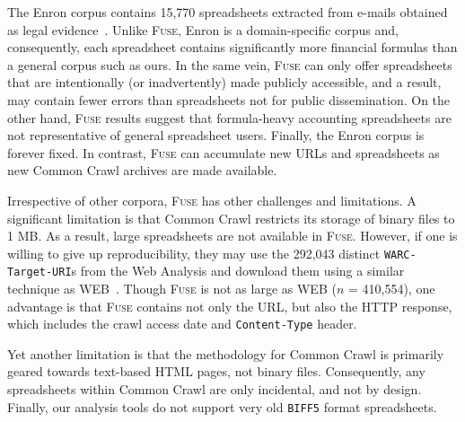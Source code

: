 \documentclass[conference]{IEEEtran}
\newcommand{\urlcountunique}{292,043}
\begin{document}
The Enron corpus contains 15,770 spreadsheets extracted from e-mails obtained as legal evidence~\cite{Hermans2015}. Unlike \textsc{Fuse}, Enron is a domain-specific corpus and, consequently, each spreadsheet contains significantly more financial formulas than a general corpus such as ours. In the same vein, \textsc{Fuse} can only offer spreadsheets that are intentionally (or inadvertently) made publicly accessible, and a result, may contain fewer errors than spreadsheets not for public dissemination. On the other hand, \textsc{Fuse} results suggest that formula-heavy accounting spreadsheets are not representative of general spreadsheet users. Finally, the Enron corpus is forever fixed. In contrast, \textsc{Fuse} can accumulate new URLs and spreadsheets as new Common Crawl archives are made available.

Irrespective of other corpora, \textsc{Fuse} has other challenges and limitations. A significant limitation is that Common Crawl restricts its storage of binary files to 1 MB. As a result, large spreadsheets are not available in \textsc{Fuse}. However, if one is willing to give up reproducibility, they may use the \urlcountunique{} distinct \texttt{WARC-Target-URI}s from the Web Analysis and download them using a similar technique as WEB~\cite{Chen2013}. Though \textsc{Fuse} is not as large as WEB ($n$ = 410,554), one advantage is that \textsc{Fuse} contains not only the URL, but also the HTTP response, which includes the crawl access date and \texttt{Content-Type} header.

Yet another limitation is that the methodology for Common Crawl is primarily geared towards text-based HTML pages, not binary files. Consequently, any spreadsheets within Common Crawl are only incidental, and not by design. Finally, our analysis tools do not support very old \texttt{BIFF5} format spreadsheets.


\end{document}
